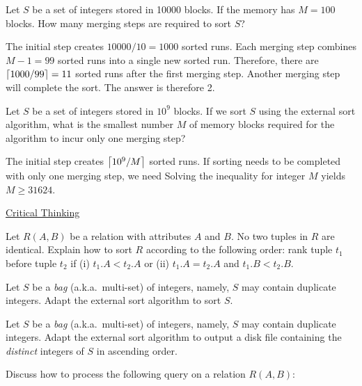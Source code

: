  Let $S$ be a set of integers stored in 10000 blocks. If the memory has $M = 100$ blocks. How many merging steps are required to sort $S$?

\begin{sol}
 The initial step creates $10000/10 = 1000$ sorted runs. Each merging step combines $M - 1 = 99$ sorted runs into a single new sorted run. Therefore, there are $\left \lceil 1000/99 \right \rceil = 11$ sorted runs after the first merging step. Another merging step will complete the sort. The answer is therefore 2.
\end{sol}

 Let $S$ be a set of integers stored in $10^9$ blocks. If we sort $S$ using the external sort algorithm, what is the smallest number $M$ of memory blocks required for the algorithm to incur only one merging step?

\begin{sol}
 The initial step creates $\left \lceil 10^9 / M \right \rceil$ sorted runs. If sorting needs to be completed with only one merging step, we need
Solving the inequality for integer $M$ yields $M \ge 31624$.

\end{sol}

\begin{center}
    \uline{Critical Thinking}
\end{center}

 Let $R(A, B)$ be a relation with attributes $A$ and $B$. No two tuples in $R$ are identical. Explain how to sort $R$ according to the following order: rank tuple $t_1$ before tuple $t_2$ if (i) $t_1.A < t_2.A$ or (ii) $t_1.A = t_2.A$ and $t_1.B < t_2.B$.

 Let $S$ be a {\em bag} (a.k.a.\ multi-set) of integers, namely, $S$ may contain duplicate integers. Adapt the external sort algorithm to sort $S$.

 Let $S$ be a {\em bag} (a.k.a.\ multi-set) of integers, namely, $S$ may contain duplicate integers. Adapt the external sort algorithm to output a disk file containing the {\em distinct} integers of $S$ in ascending order.

 Discuss how to process the following query on a relation $R(A, B)$:




